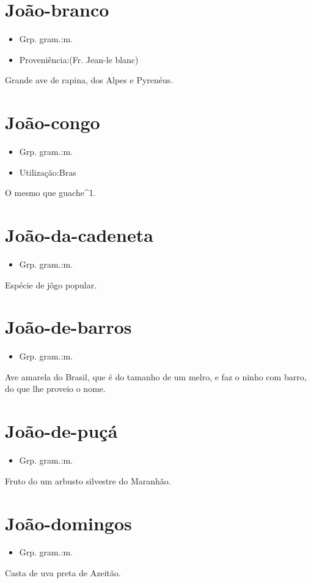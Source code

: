 \documentclass{article}
\begin{document}
\section{João-branco}
\begin{itemize}
\item {Grp. gram.:m.}
\end{itemize}
\begin{itemize}
\item {Proveniência:(Fr. \textunderscore Jean-le blanc\textunderscore )}
\end{itemize}
Grande ave de rapina, dos Alpes e Pyrenéus.
\section{João-congo}
\begin{itemize}
\item {Grp. gram.:m.}
\end{itemize}
\begin{itemize}
\item {Utilização:Bras}
\end{itemize}
O mesmo que \textunderscore guache\textunderscore ^1.
\section{João-da-cadeneta}
\begin{itemize}
\item {Grp. gram.:m.}
\end{itemize}
Espécie de jôgo popular.
\section{João-de-barros}
\begin{itemize}
\item {Grp. gram.:m.}
\end{itemize}
Ave amarela do Brasil, que é do tamanho de um melro, e faz o ninho com barro, do que lhe proveio o nome.
\section{João-de-puçá}
\begin{itemize}
\item {Grp. gram.:m.}
\end{itemize}
Fruto do um arbusto silvestre do Maranhão.
\section{João-domingos}
\begin{itemize}
\item {Grp. gram.:m.}
\end{itemize}
Casta de uva preta de Azeitão.
\end{document}
